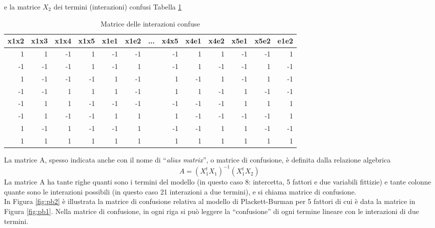 \documentclass[
  11pt,
]{book}
\begin{document}
e la matrice \(X_2\) dei termini (interazioni) confusi Tabella \ref{tab:pbmatrconf}

\begin{table}

\caption{\label{tab:pbmatrconf}Matrice delle interazioni confuse}
\centering
\begin{tabular}[t]{r|r|r|r|r|r|l|r|r|r|r|r|r}
\hline
x1x2 & x1x3 & x1x4 & x1x5 & x1e1 & x1e2 & ... & x4x5 & x4e1 & x4e2 & x5e1 & x5e2 & e1e2\\
\hline
1 & 1 & -1 & 1 & -1 & -1 &  & -1 & 1 & 1 & -1 & -1 & 1\\
\hline
-1 & -1 & -1 & 1 & -1 & 1 &  & -1 & 1 & -1 & -1 & 1 & -1\\
\hline
1 & -1 & -1 & -1 & 1 & -1 &  & 1 & -1 & 1 & -1 & 1 & -1\\
\hline
-1 & -1 & 1 & 1 & 1 & -1 &  & 1 & 1 & -1 & 1 & -1 & -1\\
\hline
-1 & 1 & 1 & -1 & -1 & -1 &  & -1 & -1 & -1 & 1 & 1 & 1\\
\hline
-1 & 1 & -1 & -1 & 1 & 1 &  & 1 & -1 & -1 & -1 & -1 & 1\\
\hline
1 & -1 & 1 & -1 & -1 & 1 &  & -1 & -1 & 1 & 1 & -1 & -1\\
\hline
1 & 1 & 1 & 1 & 1 & 1 &  & 1 & 1 & 1 & 1 & 1 & 1\\
\hline
\end{tabular}
\end{table}

La matrice A, spesso indicata anche con il nome di ``\emph{alias matrix}'', o matrice di confusione, è definita dalla relazione algebrica
\[
A=(X_1^tX_1)^{-1}(X_1^tX_2)
\]
La matrice A ha tante righe quanti sono i termini del modello (in questo caso 8: intercetta, 5 fattori e due variabili fittizie) e tante colonne quante sono le interazioni possibili (in questo caso 21 interazioni a due termini), e si chiama matrice di confusione.\\
In Figura \ref{fig:pb2} è illustrata la matrice di confusione relativa al modello di Plackett-Burman per 5 fattori di cui è data la matrice in Figura \ref{fig:pb1}. Nella matrice di confusione, in ogni riga si può leggere la ``confusione'' di ogni termine lineare con le interazioni di due termini.
\end{document}
